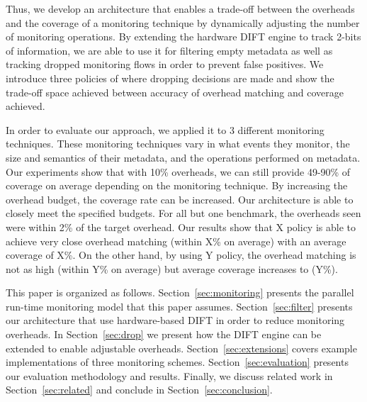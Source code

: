 Thus, we develop an architecture that enables a
trade-off between the overheads and the coverage of a monitoring technique by
dynamically adjusting the number of monitoring operations. By extending the
hardware DIFT engine to track 2-bits of information, we are able to use it for
filtering empty metadata as well as tracking dropped monitoring flows in order
to prevent false positives. We introduce three policies of where dropping
decisions are made and show the trade-off space achieved between accuracy of
overhead matching and coverage achieved.


In order to evaluate our approach, we applied it to 3 different monitoring
techniques. These monitoring techniques vary in what events they monitor, the
size and semantics of their metadata, and the operations performed on metadata.
Our experiments show that with 10\% overheads, we can still provide 49-90\% of
coverage on average depending on the monitoring technique. By increasing the
overhead budget, the coverage rate can be increased. Our architecture is able
to closely meet the specified budgets. For all but one benchmark, the overheads
seen were within 2\% of the target overhead. Our results show that X policy is
able to achieve very close overhead matching (within X\% on average) with an
average coverage of X\%. On the other hand, by using Y policy, the overhead
matching is not as high (within Y\% on average) but average coverage increases
to (Y\%).

This paper is organized as follows. Section~\ref{sec:monitoring} presents the
parallel run-time monitoring model that this paper assumes.
Section~\ref{sec:filter} presents our architecture that use hardware-based DIFT
in order to reduce monitoring overheads. In Section~\ref{sec:drop} we present
how the DIFT engine can be extended to enable adjustable overheads.
Section~\ref{sec:extensions} covers example implementations of three monitoring
schemes. Section~\ref{sec:evaluation} presents our evaluation methodology and
results. Finally, we discuss related work in Section~\ref{sec:related} and
conclude in Section~\ref{sec:conclusion}.

